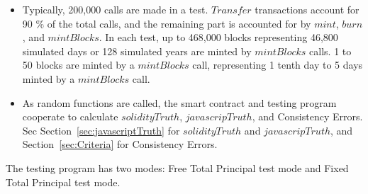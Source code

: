 \documentclass{article}
\begin{document}
\begin{itemize}
  \item Typically, 200,000 calls are made in a test. $Transfer$ transactions 
  account for 90 \% of the total calls, and the remaining part is accounted for 
  by $mint$, $burn$, and $mintBlocks$. 
  In each test, up to 468,000 blocks representing 46,800 simulated days or 
  128 simulated years are minted by $mintBlocks$ calls. 
  1 to 50 blocks are minted by a $mintBlocks$ call, representing 1 tenth day to 
  5 days minted by a $mintBlocks$ call.

  \item As random functions are called, the smart contract and testing program 
  cooperate to calculate $solidityTruth$, $javascripTruth$, and Consistency Errors.
  Sec Section~\ref{sec:javascriptTruth} for $solidityTruth$ and $javascripTruth$, 
  and Section~\ref{sec:Criteria} for Consistency Errors.
  \newline
\end{itemize}

The testing program has two modes: Free Total Principal test mode and Fixed Total Principal test mode.

\label{sec:TestModes}
\end{document}
